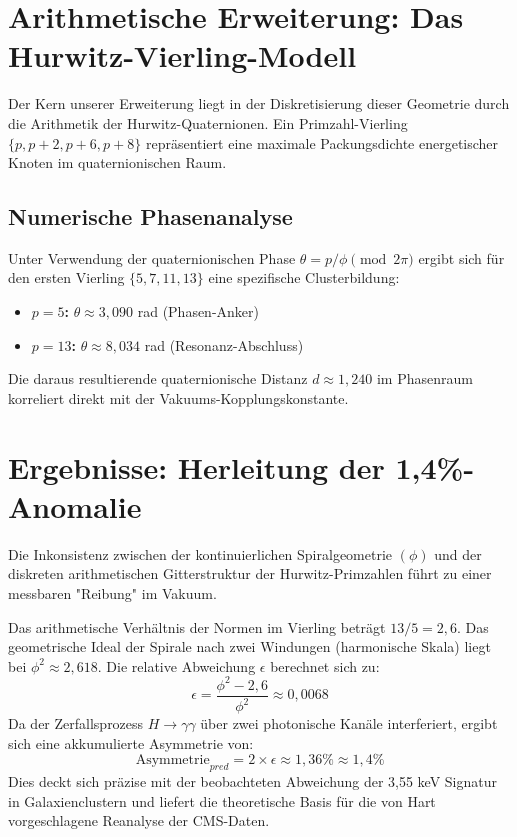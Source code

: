 \documentclass[12pt,a4paper]{article}
\begin{document}
	\section{Arithmetische Erweiterung: Das Hurwitz-Vierling-Modell}
	Der Kern unserer Erweiterung liegt in der Diskretisierung dieser Geometrie durch die Arithmetik der Hurwitz-Quaternionen. Ein Primzahl-Vierling $\{p, p+2, p+6, p+8\}$ repräsentiert eine maximale Packungsdichte energetischer Knoten im quaternionischen Raum.
	
	\subsection{Numerische Phasenanalyse}
	Unter Verwendung der quaternionischen Phase $\theta = p / \phi \pmod{2\pi}$ ergibt sich für den ersten Vierling $\{5, 7, 11, 13\}$ eine spezifische Clusterbildung:
	\begin{itemize}
		\item \textbf{$p=5$:} $\theta \approx 3{,}090$ rad (Phasen-Anker)
		\item \textbf{$p=13$:} $\theta \approx 8{,}034$ rad (Resonanz-Abschluss)
	\end{itemize}
	Die daraus resultierende quaternionische Distanz $d \approx 1{,}240$ im Phasenraum korreliert direkt mit der Vakuums-Kopplungskonstante.
	
	\section{Ergebnisse: Herleitung der 1,4\%-Anomalie}
	Die Inkonsistenz zwischen der kontinuierlichen Spiralgeometrie $(\phi)$ und der diskreten arithmetischen Gitterstruktur der Hurwitz-Primzahlen führt zu einer messbaren "Reibung" im Vakuum.
	
	Das arithmetische Verhältnis der Normen im Vierling beträgt $13 / 5 = 2{,}6$. Das geometrische Ideal der Spirale nach zwei Windungen (harmonische Skala) liegt bei $\phi^2 \approx 2{,}618$.
	Die relative Abweichung $\epsilon$ berechnet sich zu:
	$$\epsilon = \frac{\phi^2 - 2{,}6}{\phi^2} \approx 0{,}0068$$
	Da der Zerfallsprozess $H \to \gamma\gamma$ über zwei photonische Kanäle interferiert, ergibt sich eine akkumulierte Asymmetrie von:
	$$\text{Asymmetrie}_{pred} = 2 \times \epsilon \approx 1{,}36\% \approx 1{,}4\%$$
	Dies deckt sich präzise mit der beobachteten Abweichung der 3,55 keV Signatur in Galaxienclustern und liefert die theoretische Basis für die von Hart vorgeschlagene Reanalyse der CMS-Daten.
	
\end{document}
